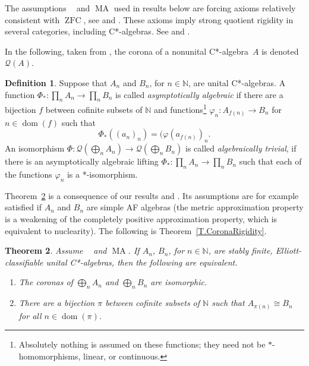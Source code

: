\documentclass[11pt]{amsproc}
\newcommand{\bbN}{\mathbb N}
\newcommand{\cstar}{C*}
\newcommand{\cQ}{\mathcal Q}
\DeclareMathOperator{\dom}{dom}
\DeclareMathOperator{\OCAT}{OCA_T}
\DeclareMathOperator{\MA}{MA}
\DeclareMathOperator{\ZFC}{ZFC}
\theoremstyle{definition}
\newtheorem{definition}{Definition}[section]
\theoremstyle{plain}
\newtheorem{theorem}[definition]{Theorem}
\theoremstyle{remark}
\begin{document}
The assumptions $\OCAT$ and $\MA$  used in results below are forcing axioms relatively consistent with $\ZFC$, 
see \cite[\S 8.6]{FarahCT} and \cite{Ku:Set}. 
These axioms imply strong quotient rigidity in several categories, including \cstar-algebras. See \cite{farah2025corona} and \cite[\S 17]{FarahCT}. 

In the following, taken from  \cite[Definition~3.13]{mckenney2020forcing},  the corona of a nonunital \cstar-algebra~$A$ is denoted $\cQ(A)$. 

\begin{definition}\label{D.Trivial} Suppose that $A_n$ and $B_n$, for $n\in \bbN$, are unital \cstar-algebras. A function $\Phi_*\colon \prod_n A_n\to \prod_n B_n$ is called \emph{asymptotically algebraic} if 
there are a bijection $f$ between cofinite subsets of $\bbN$  and functions\footnote{Absolutely nothing is assumed on these functions; they need not be $*$-homomorphisms, linear, or continuous.} $\varphi_n\colon  A_{f(n)}\to B_n$ for $n\in \dom(f)$ such that 
\[
\Phi_*((a_n)_n)= (\varphi(a_{f(n)})_n. 
\]
An isomorphism $\Phi\colon \cQ(\bigoplus_n A_n)\to \cQ(\bigoplus_n B_n)$ is called \emph{algebraically trivial}, if there is an asymptotically algebraic lifting $\Phi_*\colon \prod_n A_n\to \prod_n B_n$ such that each of the functions $\varphi_n$ is a *-isomorphism. 
\end{definition}


Theorem~\ref{T.CoronaRigidity+} is a consequence of our results and \cite{mckenney2020forcing}. Its assumptions are for example satisfied if $A_n$ and $B_n$ are simple AF algebras (the metric approximation property is a weakening of the completely positive approximation property, which is equivalent to nuclearity). 
The following is  Theorem~\ref{T.CoronaRigidity}. 

\begin{theorem} \label{T.CoronaRigidity+} Assume $\OCAT$ and $\MA$. 
	If $A_n$, $B_n$, for $n\in \bbN$, are stably finite,  Elliott-classifiable unital \cstar-algebras,  then the following are equivalent. 
	\begin{enumerate}
		\item The coronas of $\bigoplus_n A_n$ and $\bigoplus_n B_n$ are isomorphic. 
		\item There are a bijection $\pi$ between cofinite subsets of $\bbN$ such that $A_{\pi(n)}\cong B_n$ for all $n\in \dom(\pi)$. 
	\end{enumerate}
\end{theorem}
\end{document}
